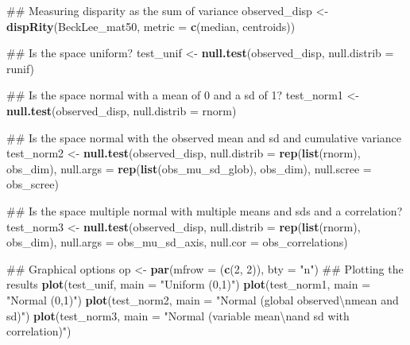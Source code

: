 \documentclass[]{book}
\newenvironment{Shaded}{\begin{snugshade}}{\end{snugshade}}
\newcommand{\KeywordTok}[1]{\textcolor[rgb]{0.13,0.29,0.53}{\textbf{#1}}}
\newcommand{\DataTypeTok}[1]{\textcolor[rgb]{0.13,0.29,0.53}{#1}}
\newcommand{\DecValTok}[1]{\textcolor[rgb]{0.00,0.00,0.81}{#1}}
\newcommand{\CharTok}[1]{\textcolor[rgb]{0.31,0.60,0.02}{#1}}
\newcommand{\StringTok}[1]{\textcolor[rgb]{0.31,0.60,0.02}{#1}}
\newcommand{\NormalTok}[1]{#1}
\theoremstyle{definition}
\theoremstyle{definition}
\theoremstyle{definition}
\theoremstyle{remark}
\begin{document}
\begin{Shaded}
\begin{Highlighting}[]
\NormalTok{## Measuring disparity as the sum of variance}
\NormalTok{observed_disp <-}\StringTok{ }\KeywordTok{dispRity}\NormalTok{(BeckLee_mat50, }\DataTypeTok{metric =} \KeywordTok{c}\NormalTok{(median, centroids))}

\NormalTok{## Is the space uniform?}
\NormalTok{test_unif <-}\StringTok{ }\KeywordTok{null.test}\NormalTok{(observed_disp, }\DataTypeTok{null.distrib =}\NormalTok{ runif)}

\NormalTok{## Is the space normal with a mean of 0 and a sd of 1?}
\NormalTok{test_norm1 <-}\StringTok{ }\KeywordTok{null.test}\NormalTok{(observed_disp, }\DataTypeTok{null.distrib =}\NormalTok{ rnorm)}

\NormalTok{## Is the space normal with the observed mean and sd and cumulative variance}
\NormalTok{test_norm2 <-}\StringTok{ }\KeywordTok{null.test}\NormalTok{(observed_disp, }\DataTypeTok{null.distrib =} \KeywordTok{rep}\NormalTok{(}\KeywordTok{list}\NormalTok{(rnorm), obs_dim),}
                        \DataTypeTok{null.args =} \KeywordTok{rep}\NormalTok{(}\KeywordTok{list}\NormalTok{(obs_mu_sd_glob), obs_dim),}
                        \DataTypeTok{null.scree =}\NormalTok{ obs_scree)}

\NormalTok{## Is the space multiple normal with multiple means and sds and a correlation?}
\NormalTok{test_norm3 <-}\StringTok{ }\KeywordTok{null.test}\NormalTok{(observed_disp, }\DataTypeTok{null.distrib =} \KeywordTok{rep}\NormalTok{(}\KeywordTok{list}\NormalTok{(rnorm), obs_dim),}
                        \DataTypeTok{null.args =}\NormalTok{ obs_mu_sd_axis, }\DataTypeTok{null.cor =}\NormalTok{ obs_correlations)}


\NormalTok{## Graphical options}
\NormalTok{op <-}\StringTok{ }\KeywordTok{par}\NormalTok{(}\DataTypeTok{mfrow =}\NormalTok{ (}\KeywordTok{c}\NormalTok{(}\DecValTok{2}\NormalTok{, }\DecValTok{2}\NormalTok{)), }\DataTypeTok{bty =} \StringTok{"n"}\NormalTok{)}
\NormalTok{## Plotting the results}
\KeywordTok{plot}\NormalTok{(test_unif, }\DataTypeTok{main =} \StringTok{"Uniform (0,1)"}\NormalTok{)}
\KeywordTok{plot}\NormalTok{(test_norm1, }\DataTypeTok{main =} \StringTok{"Normal (0,1)"}\NormalTok{)}
\KeywordTok{plot}\NormalTok{(test_norm2, }\DataTypeTok{main =} \StringTok{"Normal (global observed}\CharTok{\textbackslash{}n}\StringTok{mean and sd)"}\NormalTok{)}
\KeywordTok{plot}\NormalTok{(test_norm3, }\DataTypeTok{main =} \StringTok{"Normal (variable mean}\CharTok{\textbackslash{}n}\StringTok{and sd with correlation)"}\NormalTok{)}
\end{Highlighting}
\end{Shaded}
\end{document}
